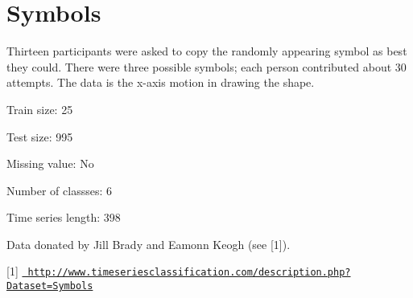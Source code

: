 \chapter{Symbols}
\hypertarget{md_external_2data_2UCRArchive__2018_2Symbols_2README}{}\label{md_external_2data_2UCRArchive__2018_2Symbols_2README}
\label{md_external_2data_2UCRArchive__2018_2Symbols_2README_autotoc_md217}%
%
 Thirteen participants were asked to copy the randomly appearing symbol as best they could. There were three possible symbols; each person contributed about 30 attempts. The data is the x-\/axis motion in drawing the shape.

Train size\+: 25

Test size\+: 995

Missing value\+: No

Number of classses\+: 6

Time series length\+: 398

Data donated by Jill Brady and Eamonn Keogh (see \mbox{[}1\mbox{]}).

\mbox{[}1\mbox{]} \href{http://www.timeseriesclassification.com/description.php?Dataset=Symbols}{\texttt{ http\+://www.\+timeseriesclassification.\+com/description.\+php?\+Dataset=\+Symbols}} 